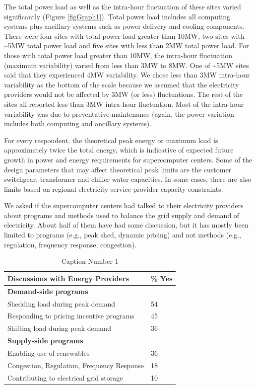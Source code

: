 The total power load as well as the intra-hour fluctuation of these sites
varied significantly (Figure \ref{figGraph1}). Total power load includes all computing systems plus 
ancillary systems such as power delivery and cooling components.
There were four sites with total power load greater
than 10MW, two sites with \textasciitilde 5MW total power load and five
sites with less than 2MW total power load. For those with total power load greater than 10MW, the
intra-hour fluctuation (maximum variability) varied from less than 3MW to 8MW. One of
\textasciitilde 5MW sites said that they experienced 4MW variability. We chose less than 3MW intra-hour
variability as the bottom of the scale because we assumed that the
electricity providers would not be affected by 3MW (or less) 
fluctuations. The
rest of the sites all reported less than 3MW intra-hour fluctuation. Most of the intra-hour variability
was due to preventative maintenance (again, the power variation includes both computing and ancillary systems).

For every respondent, the theoretical peak energy or maximum load is approximately twice the total energy, 
which is indicative of expected future growth in power and energy requirements for supercomputer centers.  
Some of the design parameters that may affect theoretical peak limits are the customer switchgear, transformer 
and chiller water capacities.  
In some cases, there are also limits based on regional electricity service provider capacity constraints.

We asked if the supercomputer centers had talked to their electricity
providers about programs and methods used to balance the grid supply and
demand of electricity. About half of them have had some discussion, but it
has mostly been limited to programs (e.g., peak shed, dynamic pricing) 
and not methods (e.g., regulation, frequency response, congestion).

\begin{table}[htbp]
\caption{Caption Number 1}
\begin{tabular}{|p{190pt}|l|}
\hline
\textbf{Discussions with Energy Providers}&
{\%} Yes \\
\hline
\textbf{Demand-side programs}&
~ \\
\hline
Shedding load during peak demand&
54 \\
\hline
Responding to pricing incentive programs&
45 \\
\hline
Shifting load during peak demand&
36 \\
\hline
\textbf{Supply-side programs}&
~ \\
\hline
Enabling use of renewables&
36 \\
\hline
Congestion, Regulation, Frequency Response&
18 \\
\hline
Contributing to electrical grid storage&
10 \\
\hline
\end{tabular}
\label{tab2}
\end{table}

